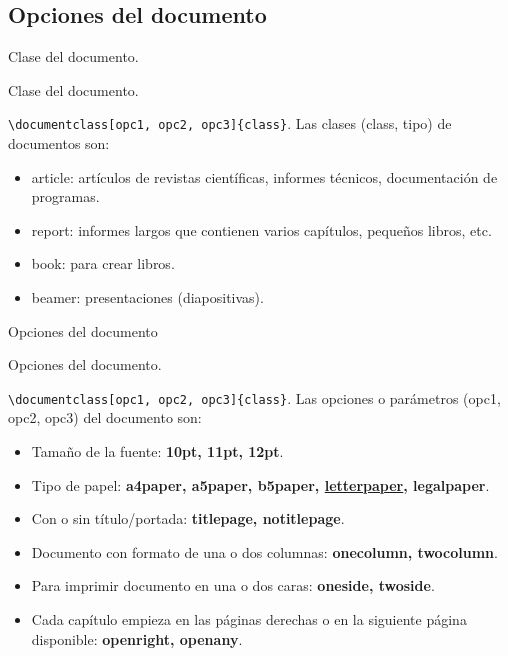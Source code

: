 \documentclass[aspectratio=169, 10pt]{beamer}
\begin{document}
\subsection{Opciones del documento}
\begin{frame}[fragile]{Clase del documento.}

\begin{exampleblock}{Clase del documento.}

\verb|\documentclass[opc1, opc2, opc3]{class}|. \pause
\vspace{2mm}
Las clases (class, tipo) de documentos son: \pause   

\begin{itemize} 
    
    \item article: artículos de revistas científicas, informes técnicos, documentación de programas. \pause
    \item report: informes largos que contienen varios capítulos, pequeños libros, etc. \pause
    \item book: para crear libros. \pause
    \item beamer: presentaciones (diapositivas).
\end{itemize}

\end{exampleblock}
\end{frame}




\begin{frame}[fragile]{Opciones del documento}

\begin{exampleblock}{Opciones del documento.}

\verb|\documentclass[opc1, opc2, opc3]{class}|. \pause
\vspace{2mm}
Las opciones o parámetros (opc1, opc2, opc3) del documento son: \pause   

    \begin{itemize}
        \item Tamaño de la fuente: \textbf{10pt, 11pt, 12pt}. \pause
        \item Tipo de papel: \textbf{a4paper, a5paper, b5paper, \uline{letterpaper}, legalpaper}. \pause
        \item Con o sin título/portada: \textbf{titlepage, notitlepage}. \pause
        \item Documento con formato de una o dos columnas: \textbf{onecolumn, twocolumn}. \pause
        \item Para imprimir documento en una o dos caras: \textbf{oneside, twoside}. \pause
        \item Cada capítulo empieza en las páginas derechas o en la siguiente página disponible: \textbf{openright, openany}. 
    \end{itemize}

\end{exampleblock}
\end{frame}
\end{document}
